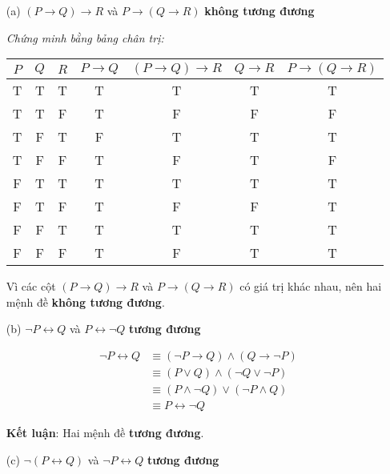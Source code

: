 \documentclass[11pt, oneside,openright,a4paper]{book}
\begin{document}
\begin{enumerate}
    \item[(a)] $(P \rightarrow Q) \rightarrow R$ và $P \rightarrow (Q \rightarrow R)$ \textbf{không tương đương}

    \textit{Chứng minh bằng bảng chân trị:}

    \begin{center}
    \begin{tabular}{|c|c|c|c|c|c|c|}
        \hline
        $P$ & $Q$ & $R$ & $P \rightarrow Q$ & $(P \rightarrow Q) \rightarrow R$ & $Q \rightarrow R$ & $P \rightarrow (Q \rightarrow R)$ \\
        \hline
        T & T & T & T & T & T & T \\
        T & T & F & T & F & F & F \\
        T & F & T & F & T & T & T \\
        T & F & F & T & F & T & F \\
        F & T & T & T & T & T & T \\
        F & T & F & T & F & F & T \\
        F & F & T & T & T & T & T \\
        F & F & F & T & F & T & T \\
        \hline
    \end{tabular}
    \end{center}

    Vì các cột $(P \rightarrow Q) \rightarrow R$ và $P \rightarrow (Q \rightarrow R)$ có giá trị khác nhau, nên hai mệnh đề \textbf{không tương đương}.

    \item[(b)] $\neg P \leftrightarrow Q$ và $P \leftrightarrow \neg Q$ \textbf{tương đương}

    \begin{align*}
        \neg P \leftrightarrow Q &\equiv (\neg P \rightarrow Q) \land (Q \rightarrow \neg P) \\
        &\equiv (P \lor Q) \land (\neg Q \lor \neg P) \\
        &\equiv (P \land \neg Q) \lor (\neg P \land Q) \\
        &\equiv P \leftrightarrow \neg Q
    \end{align*}

    \textbf{Kết luận}: Hai mệnh đề \textbf{tương đương}.

    \item[(c)] $\neg(P \leftrightarrow Q)$ và $\neg P \leftrightarrow Q$ \textbf{tương đương}


\end{enumerate}
\end{document}
